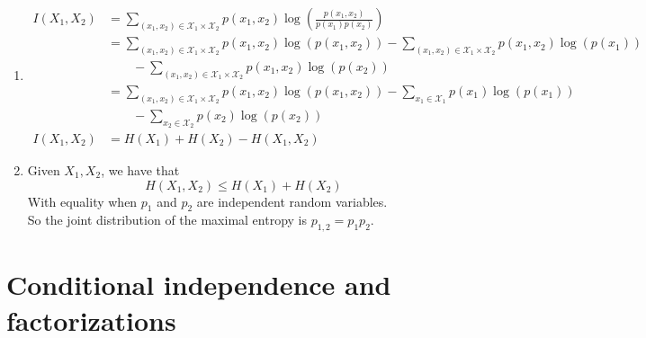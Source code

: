\documentclass[a4paper,10pt]{article}
\begin{document}
\begin{enumerate}
\begin{enumerate}
\item 
\begin{align*}
I(X_1,X_2)  & = \sum_{(x_1,x_2)\in \mathcal{X}_1 \times \mathcal{X}_2} p(x_1,x_2) \log\left( \frac{p(x_1,x_2)}{p(x_1) p(x_2)}\right) \\
				& = \sum_{(x_1,x_2)\in \mathcal{X}_1 \times \mathcal{X}_2} p(x_1,x_2) \log\left( p(x_1,x_2) \right) - \sum_{(x_1,x_2)\in \mathcal{X}_1 \times \mathcal{X}_2} p(x_1,x_2) \log\left( p(x_1)  \right)  \\
				& \qquad  - \sum_{(x_1,x_2)\in \mathcal{X}_1 \times \mathcal{X}_2} p(x_1,x_2) \log\left( p(x_2)  \right)   \\
				& = \sum_{(x_1,x_2)\in \mathcal{X}_1 \times \mathcal{X}_2} p(x_1,x_2) \log\left( p(x_1,x_2) \right) - \sum_{x_1\in \mathcal{X}_1 } p(x_1) \log\left( p(x_1)  \right) \\ 
				& \qquad - \sum_{x_2 \in \mathcal{X}_2} p(x_2) \log\left( p(x_2)  \right)   \\
	I(X_1,X_2)			& = H(X_1) + H(X_2) - H(X_1,X_2)
\end{align*}
\item Given $X_1,X_2$, we have that 
\[ 
H(X_1,X_2) \leq H(X_1) + H(X_2) 
\] 
With equality when $p_1$ and $p_2$ are independent random variables. \\
So the joint distribution of the maximal entropy is $p_{1,2} = p_1 p_2 $. 
\end{enumerate}
\end{enumerate}

\section{ Conditional independence and factorizations }
\end{document}
